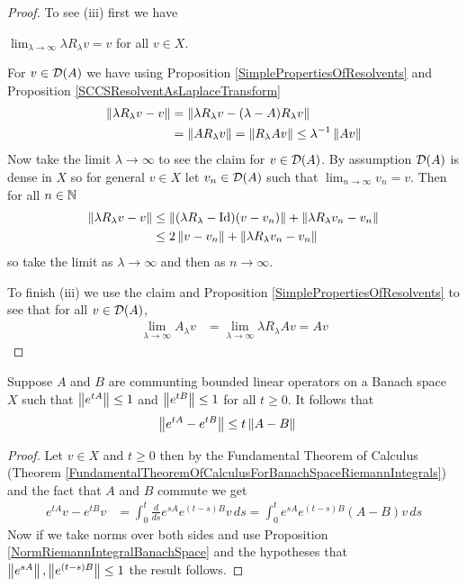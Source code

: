 \begin{proof}
To see (iii) first we have
\begin{clm}$\lim_{\lambda \to \infty} \lambda R_\lambda v = v$ for all $v \in X$.
\end{clm}
For $v \in \mathcal{D}(A)$ we have using Proposition \ref{SimplePropertiesOfResolvents} and Proposition \ref{SCCSResolventAsLaplaceTransform}
\begin{align*}
\left \lVert \lambda R_\lambda v - v \right \rVert &= \left \lVert \lambda R_\lambda v - (\lambda  -  A) R_\lambda v \right \rVert \\
&= \left \lVert A R_\lambda v \right \rVert = \left \lVert R_\lambda A v \right \rVert \leq \lambda^{-1} \left \lVert Av \right \rVert
\end{align*}
Now take the limit $\lambda \to \infty$ to see the claim for $v \in \mathcal{D}(A)$.  By assumption $\mathcal{D}(A)$ is dense in $X$ so for general $v \in X$ let $v_n \in \mathcal{D}(A)$ such
that $\lim_{n \to \infty} v_n = v$.  Then for all $n \in \mathbb{N}$
\begin{align*}
\left \lVert \lambda R_\lambda v - v \right \rVert &\leq \left \lVert (\lambda R_\lambda - \operatorname*{Id})(v - v_n) \right \rVert + \left \lVert \lambda R_\lambda v_n - v_n \right \rVert \\
&\leq 2 \left \lVert v-v_n \right \rVert + \left \lVert \lambda R_\lambda v_n - v_n \right \rVert
\end{align*}
so take the limit as $\lambda \to \infty$ and then as $n \to \infty$.  

To finish (iii) we use the claim and Proposition \ref{SimplePropertiesOfResolvents} to see that for all $v \in \mathcal{D}(A)$,
\begin{align*}
\lim_{\lambda \to \infty} A_\lambda v &= \lim_{\lambda \to \infty} \lambda R_\lambda A v = A v
\end{align*}
\end{proof}

\begin{lem}\label{SemigroupBoundInTermsOfBoundedGenerator}Suppose $A$ and $B$ are communting bounded linear operators on a Banach space $X$ such that $\left \lVert e^{tA} \right \rVert \leq 1$ and $\left \lVert e^{tB} \right \rVert \leq 1$ for all $t \geq 0$. It follows that
\begin{align*}
\left \lVert e^{tA} - e^{tB} \right \rVert &\leq t \left \lVert A-B \right \rVert
\end{align*}
\end{lem}
\begin{proof}
Let $v \in X$ and $t \geq 0$ then by the Fundamental Theorem of Calculus (Theorem \ref{FundamentalTheoremOfCalculusForBanachSpaceRiemannIntegrals}) and the fact that $A$ and $B$ commute we get
\begin{align*}
e^{tA}v  - e^{tB} v &= \int_0^t \frac{d}{ds} e^{sA} e^{(t-s)B} v \, ds = \int_0^t e^{sA} e^{(t-s)B} (A-B) v \, ds
\end{align*}
Now if we take norms over both sides and use Proposition \ref{NormRiemannIntegralBanachSpace} and the hypotheses that $\left \lVert e^{sA} \right \rVert, \left \lVert e^{(t-s)B} \right \rVert \leq 1$ the result follows.
\end{proof}

